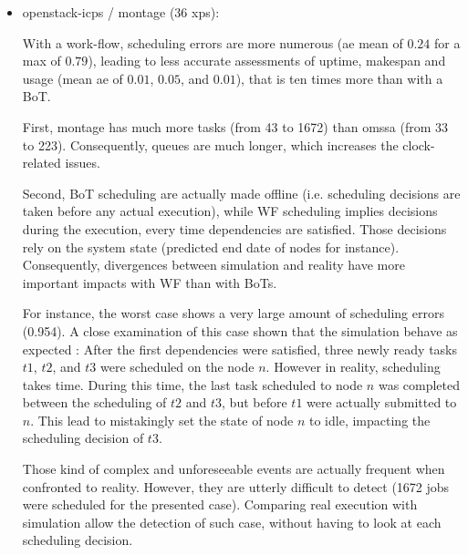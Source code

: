 {\begin{itemize}
      This shows that, providing that one can inject the right information, 
      the only limitation of our simulator are micro clock-related hazards.
      
      
 \item openstack-icps / montage (36 xps): 
 
      

      

      With a work-flow, scheduling errors are more numerous 
      (ae mean of $0.24$ for a max of $0.79$), leading to less accurate assessments
      of uptime, makespan and usage (mean ae of $0.01$, $0.05$, and $0.01$), that
      is ten times more than with a BoT.
      
      First, montage has much more tasks (from 43 to 1672) than omssa (from 33 to 223).
      Consequently, queues are much longer, which increases the clock-related issues.
      
      Second, BoT scheduling are actually made offline (i.e. scheduling decisions are taken
      before any actual execution), while WF scheduling implies decisions during 
      the execution, every time dependencies are satisfied. 
      Those decisions rely on the system state (predicted end date of nodes for 
      instance). Consequently, divergences between simulation and reality have
      more important impacts with WF than with BoTs.
      
      
      For instance, the worst case shows a very large amount of scheduling errors 
      (0.954). A close examination of this case shown that the simulation behave
      as expected : After the first dependencies were satisfied,
      three newly ready tasks $t1$, $t2$, and $t3$ were scheduled on the node $n$.
      However in reality, scheduling takes time. During this time, the last task
      scheduled to node $n$ was completed between the scheduling of $t2$ and $t3$, 
      but before $t1$ were actually submitted to $n$. This lead to mistakingly 
      set the state of node $n$ to idle, impacting the scheduling decision of $t3$.
      
      Those kind of complex and unforeseeable events are actually frequent 
      when confronted to reality. However, they are utterly difficult to detect
      (1672 jobs were scheduled for the presented case).
      Comparing real execution with simulation allow the detection of such case, 
      without having to look at each scheduling decision.
      

\end{itemize}}

